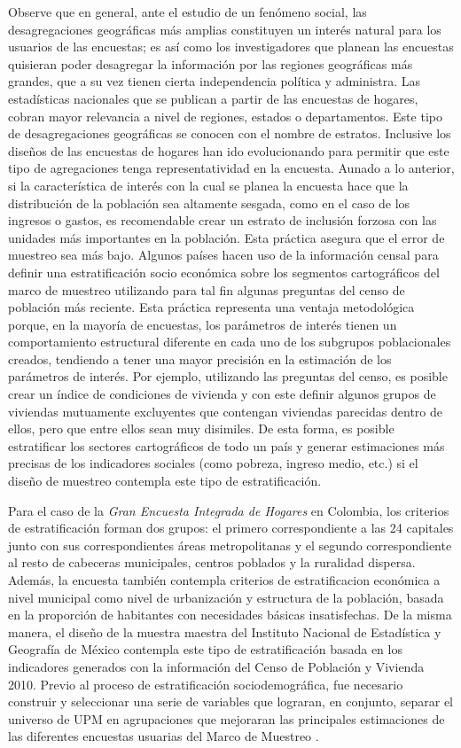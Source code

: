 Observe que en general, ante el estudio de un fenómeno social, las desagregaciones geográficas más amplias constituyen un interés natural para los usuarios de las encuestas; es así como los investigadores que planean las encuestas quisieran poder desagregar la información por las regiones geográficas más grandes, que a su vez tienen cierta independencia política y administra. Las estadísticas nacionales que se publican a partir de las encuestas de hogares, cobran mayor relevancia a nivel de regiones, estados o departamentos. Este tipo de desagregaciones geográficas se conocen con el nombre de estratos. Inclusive los diseños de las encuestas de hogares han ido evolucionando para permitir que este tipo de agregaciones tenga representatividad en la encuesta. Aunado a lo anterior, si la característica de interés con la cual se planea la encuesta hace que la distribución de la población sea altamente sesgada, como en el caso de los ingresos o gastos, es recomendable crear un estrato de inclusión forzosa con las unidades más importantes en la población. Esta práctica asegura que el error de muestreo sea más bajo. Algunos países hacen uso de la información censal para definir una estratificación socio económica sobre los segmentos cartográficos del marco de muestreo utilizando para tal fin algunas preguntas del censo de población más reciente. Esta práctica representa una ventaja metodológica porque, en la mayoría de encuestas, los parámetros de interés tienen un comportamiento estructural diferente en cada uno de los subgrupos poblacionales creados, tendiendo a tener una mayor precisión en la estimación de los parámetros de interés. Por ejemplo, utilizando las preguntas del censo, es posible crear un índice de condiciones de vivienda y con este definir algunos grupos de viviendas mutuamente excluyentes que contengan viviendas parecidas dentro de ellos, pero que entre ellos sean muy disimiles. De esta forma, es posible estratificar los sectores cartográficos de todo un país y generar estimaciones más precisas de los indicadores sociales (como pobreza, ingreso medio, etc.) si el diseño de muestreo contempla este tipo de estratificación.

Para el caso de la \emph{Gran Encuesta Integrada de Hogares} en Colombia, los criterios de estratificación forman dos grupos: el primero correspondiente a las 24 capitales junto con sus correspondientes áreas metropolitanas y el segundo correspondiente al resto de cabeceras municipales, centros poblados y la ruralidad dispersa. Además, la encuesta también contempla criterios de estratificacion económica a nivel municipal como nivel de urbanización y estructura de la población, basada en la proporción de habitantes con necesidades básicas insatisfechas. De la misma manera, el diseño de la muestra maestra del Instituto Nacional de Estadística y Geografía de México contempla este tipo de estratificación basada en los indicadores generados con la información del Censo de Población y Vivienda 2010. Previo al proceso de estratificación sociodemográfica, fue necesario construir y seleccionar una serie de variables que lograran, en conjunto, separar el universo de UPM en agrupaciones que mejoraran las principales estimaciones de las diferentes encuestas usuarias del Marco de Muestreo \citep{INEGI_MX_2012}.

